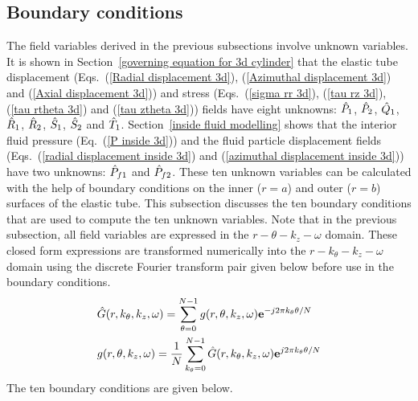 \documentclass[11pt,cleanfoot]{asme2ej}
\begin{document}
\subsection{Boundary conditions}\label{BCS}
The field variables derived in the previous subsections involve unknown variables. It is shown in Section~\ref{governing equation for 3d cylinder} that the elastic tube displacement (Eqs.~(\ref{Radial displacement 3d}), (\ref{Azimuthal displacement 3d}) and (\ref{Axial displacement 3d})) and stress (Eqs.~(\ref{sigma rr 3d}), (\ref{tau rz 3d}), (\ref{tau rtheta 3d}) and (\ref{tau ztheta 3d})) fields have eight unknowns: $\Hat{P}_1$, $\Hat{P}_2$, $\Hat{Q}_1$, $\Hat{R}_1$, $\Hat{R}_2$, $\Hat{S}_1$, $\Hat{S}_2$ and $\Hat{T}_1$. Section~\ref{inside fluid modelling} shows that the interior fluid pressure (Eq.~(\ref{P inside 3d})) and the fluid particle displacement fields (Eqs.~(\ref{radial displacement inside 3d}) and (\ref{azimuthal displacement inside 3d})) have two unknowns: $\Hat{P}_{f1}$ and $\Hat{P}_{f2}$. These ten unknown variables can be calculated with the help of boundary conditions on the inner ($r=a$) and outer ($r=b$) surfaces of the elastic tube. This subsection discusses the ten boundary conditions that are used to compute the ten unknown variables. Note that in the previous subsection, all field variables are expressed in the $r-\theta-k_z-\omega$ domain. These closed form expressions are transformed numerically into the $r-k_\theta-k_z-\omega$ domain using the discrete Fourier transform pair given below before use in the boundary conditions.
\begin{align}
    &\Hat{G}(r,k_\theta,k_z,\omega) = \sum_{\theta=0}^{N-1} g(r,\theta,k_z,\omega)\mathbf{e}^{-j2\pi k_\theta\theta/N}\label{Forward Fourier tranform theta}\\
    &g(r,\theta,k_z,\omega) = \frac{1}{N}\sum_{k_\theta = 0}^{N-1}\Hat{G}(r,k_\theta,k_z,\omega)\mathbf{e}^{j2\pi k_\theta \theta/N}\label{Backward Fourier transform theta}
\end{align}
The ten boundary conditions are given below.
\end{document}
